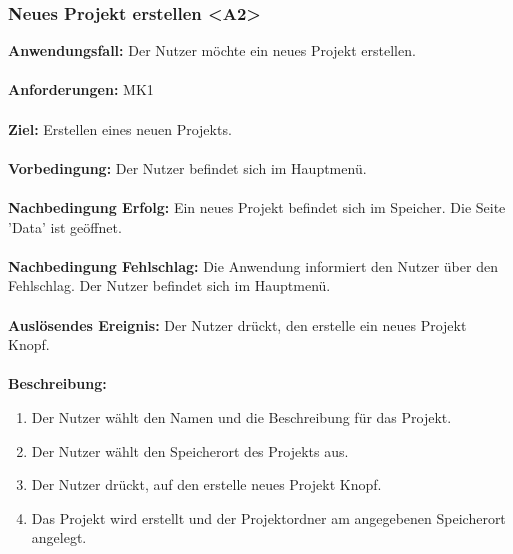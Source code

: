 \documentclass[parskip=full]{scrartcl} %
\begin{document}
\subsubsection*{Neues Projekt erstellen <A2>}
\textbf{Anwendungsfall:} Der Nutzer möchte ein neues Projekt erstellen.\\\\
\textbf{Anforderungen:} MK1\\\\
\textbf{Ziel:} Erstellen eines neuen Projekts. \\\\
\textbf{Vorbedingung:} Der Nutzer befindet sich im Hauptmenü. \\\\
\textbf{Nachbedingung Erfolg:} Ein neues Projekt befindet sich im Speicher. Die Seite 'Data' ist geöffnet.  \\\\
\textbf{Nachbedingung Fehlschlag:} Die Anwendung informiert den Nutzer über den Fehlschlag. Der Nutzer befindet sich im Hauptmenü. \\\\
\textbf{Auslösendes Ereignis:} Der Nutzer drückt, den erstelle ein neues Projekt Knopf. \\\\
\textbf{Beschreibung:}
\begin{enumerate}
    \item Der Nutzer wählt den Namen und die Beschreibung für das Projekt.
    \item Der Nutzer wählt den Speicherort des Projekts aus.
    \item Der Nutzer drückt, auf den erstelle neues Projekt Knopf.
    \item Das Projekt wird erstellt und der Projektordner am angegebenen Speicherort angelegt.
\end{enumerate}
\newpage
\end{document}
